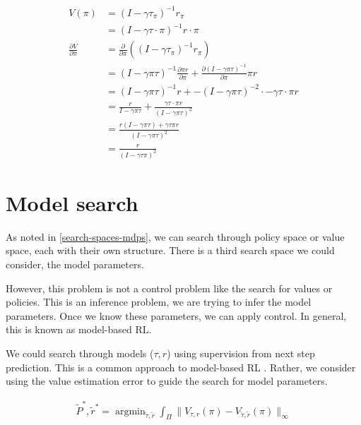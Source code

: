 \begin{align*}
V(\pi) &= (I − \gamma \tau_{\pi})^{−1}r_{\pi} \tag{value functional}\\
&= (I − \gamma \tau\cdot \pi)^{−1}r\cdot \pi \\
\frac{\partial V}{\partial \pi} &= \frac{\partial}{\partial \pi}((I-\gamma \tau_{\pi})^{-1} r_{\pi}) \\
&= (I-\gamma \pi \tau)^{-1} \frac{\partial \pi r}{\partial \pi}+   \frac{\partial (I-\gamma \pi \tau)^{-1}}{\partial \pi}\pi r\tag{product rule} \\
&= (I-\gamma \pi \tau)^{-1} r + -(I-\gamma \pi \tau)^{-2} \cdot -\gamma \tau\cdot \pi r\\
&= \frac{r}{I-\gamma \pi \tau} + \frac{ \gamma \tau\cdot \pi r}{(I-\gamma \pi \tau)^2} \tag{rewrite as fractions}\\
&= \frac{r(I-\gamma \pi \tau) + \gamma \tau \pi r}{(I-\gamma \pi \tau)^2} \tag{common demoninator}\\
& = \frac{r}{(I-\gamma \tau \pi)^2} \tag{cancel}
\end{align*}

\newpage
\section{Model search} \label{model-iteration}

As noted in \ref{search-spaces-mdps}, we can search through policy space or value
space, each with their own structure.
There is a third search space we could consider, the model parameters.

However, this problem is not a control problem like the search for values or policies.
This is an inference problem, we are trying to infer the model parameters.
Once we know these parameters, we can apply control.
In general, this is known as model-based RL.

We could search through models ($\tau, r$) using supervision from next step prediction.
This is a common approach to model-based RL \cite{Wang2019a}.
Rather, we consider using the value estimation error to guide the search for model parameters.

\begin{align*}
\tilde P^{* }, \tilde r^{* } = \mathop{\text{argmin}}_{\tilde \tau, \tilde r} \int_{\Pi} \parallel V_{\tau, r}(\pi)-V_{\tilde \tau, \tilde r}(\pi) \parallel_\infty
\label{eq:model-iteration}
\end{align*}

